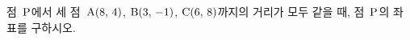 점~$\mathrm{P}$에서 세 점~$\mathrm{A}(8,\,4)$, $\mathrm{B}(3,\,-1)$, $\mathrm{C}(6,\,8)$까지의 거리가 모두 같을 때, 점~$\mathrm{P}$의 좌표를 구하시오.
